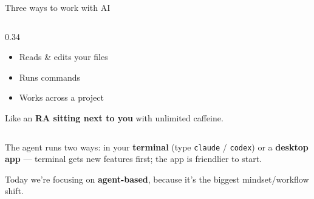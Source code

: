 \documentclass[aspectratio=169, 10pt]{beamer}
\begin{document}
\begin{frame}{Three ways to work with AI}
\begin{columns}[T]
\begin{column}{0.34\textwidth}
\begin{tcolorbox}
\begin{itemize}
  \item[\color{SlateTeal}\faCheck] Reads \& edits your files
  \item[\color{SlateTeal}\faCheck] Runs commands
  \item[\color{SlateTeal}\faCheck] Works across a project
\end{itemize}
\vskip2pt
{\color{CoolGray} Like an \textbf{RA sitting next to you} with unlimited caffeine.}
\end{tcolorbox}
\end{column}
\end{columns}
\vskip4pt
{\centering\scriptsize\color{CoolGray} The agent runs two ways: in your \textbf{terminal} (type \texttt{claude} / \texttt{codex}) or a \textbf{desktop app} --- terminal gets new features first; the app is friendlier to start.\par}
\vskip4pt
\begin{tcolorbox}[accentbox, halign=center, top=3pt, bottom=3pt]
\small Today we're focusing on \textbf{agent-based}, because it's the biggest mindset/workflow shift.
\end{tcolorbox}
\end{frame}
\end{document}

